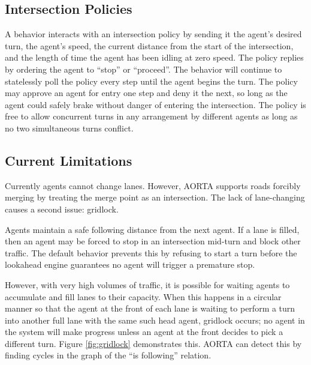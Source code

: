 \documentclass[letterpaper, 10 pt, conference]{ieeeconf}  %
\begin{document}
\subsection{Intersection Policies}

A behavior interacts with an intersection policy by sending it the agent's
desired turn, the agent's speed, the current distance from the start of the
intersection, and the length of time the agent has been idling at zero speed.
The policy replies by ordering the agent to ``stop'' or ``proceed''. The
behavior will continue to statelessly poll the policy every step until the agent
begins the turn. The policy may approve an agent for entry one step and deny it
the next, so long as the agent could safely brake without danger of entering the
intersection. The policy is free to allow concurrent turns in any arrangement
by different agents as long as no two simultaneous turns conflict.

\subsection{Current Limitations}

Currently agents cannot change lanes. However, AORTA supports roads forcibly
merging by treating the merge point as an intersection. The lack of
lane-changing causes a second issue: gridlock.

Agents maintain a safe following distance from the next agent. If a lane is
filled, then an agent may be forced to stop in an intersection mid-turn and
block other traffic. The default behavior prevents this by refusing to start a
turn before the lookahead engine guarantees no agent will trigger a premature
stop.

However, with very high volumes of traffic, it is possible for waiting agents to
accumulate and fill lanes to their capacity. When this happens in a circular
manner so that the agent at the front of each lane is waiting to perform a turn
into another full lane with the same such head agent, gridlock \cite{AAAI11-au}
occurs; no agent in the system will make progress unless an agent at the front
decides to pick a different turn. Figure \ref{fig:gridlock} demonstrates this.
AORTA can detect this by finding cycles in the graph of the ``is following''
relation.
\end{document}
